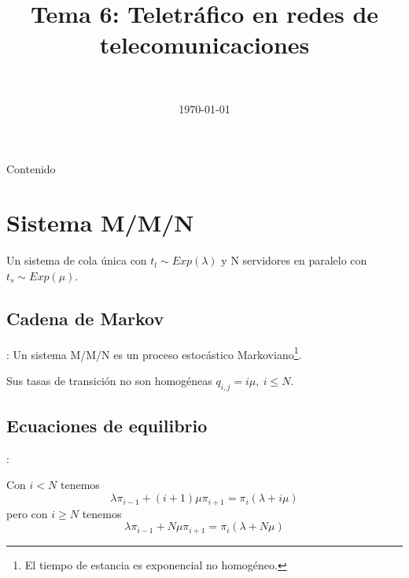 \documentclass[xcolor={x11names}]{beamer}
\title[Tema 6]{Tema 6: Teletráfico en redes de telecomunicaciones}
\author{\textcolor{white}{RSTC curso 2022-2023}}
\date{\today}
\begin{document}
\frame{\titlepage}


\begin{frame}{Contenido}
    \tableofcontents
\end{frame}


\section{Sistema M/M/N}
\begin{frame}{\secname}
    Un sistema de cola única
    con $t_l\sim Exp(\lambda)$
    y N servidores en paralelo
    con $t_s\sim Exp(\mu)$.
    \begin{figure}
        
    \end{figure}
\end{frame}


\subsection{Cadena de Markov}
\begin{frame}{\secname: \subsecname}
    Un sistema M/M/N es un proceso
    estocástico Markoviano\footnote{
    El tiempo de estancia es
    exponencial no homogéneo.}.
    \begin{figure}
        \resizebox{!}{.2\textwidth}{%
            
        }
    \end{figure}
    Sus tasas de transición no son
    homogéneas $q_{i,j}=i\mu,\ i\leq N$.
    \begin{figure}
        \resizebox{!}{.2\textwidth}{%
            
        }
    \end{figure}
\end{frame}



\subsection{Ecuaciones de equilibrio}
\begin{frame}{\secname: \subsecname}
    \begin{figure}
        \resizebox{!}{.2\textwidth}{%
            
        }
    \end{figure}
    Con $i<N$ tenemos
    \begin{equation*}
        \lambda\pi_{i-1}
        +(i+1)\mu\pi_{i+1}
        = \pi_i(\lambda+i\mu)
    \end{equation*}
    pero con $i\geq N$ tenemos
    \begin{equation*}
        \lambda\pi_{i-1}
        +N\mu\pi_{i+1}
        = \pi_i(\lambda+N\mu)
    \end{equation*}
\end{frame}
\end{document}
